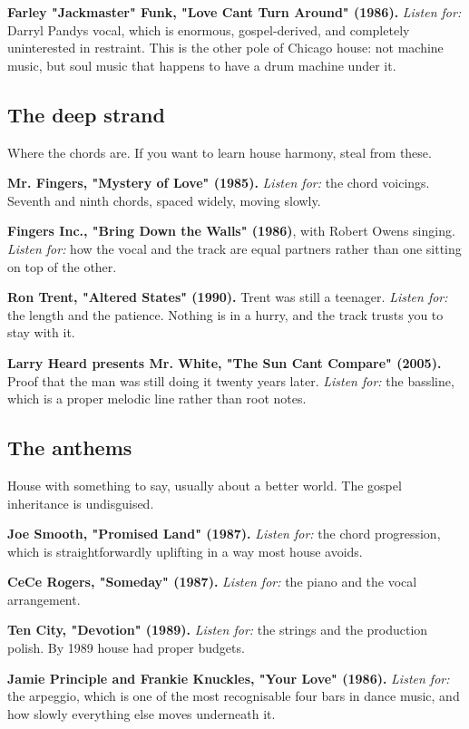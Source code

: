 \textbf{Farley "Jackmaster" Funk, "Love Can\textquotesingle t Turn Around" (1986).} \emph{Listen for:} Darryl Pandy\textquotesingle s
vocal, which is enormous, gospel-derived, and completely uninterested in restraint. This is
the other pole of Chicago house: not machine music, but soul music that happens to have a
drum machine under it.

\subsection{The deep strand}\label{li01_canon-the-deep-strand}

Where the chords are. If you want to learn house harmony, steal from these.

\textbf{Mr. Fingers, "Mystery of Love" (1985).} \emph{Listen for:} the chord voicings. Seventh and
ninth chords, spaced widely, moving slowly.

\textbf{Fingers Inc., "Bring Down the Walls" (1986)}, with Robert Owens singing. \emph{Listen for:} how
the vocal and the track are equal partners rather than one sitting on top of the other.

\textbf{Ron Trent, "Altered States" (1990).} Trent was still a teenager. \emph{Listen for:} the length
and the patience. Nothing is in a hurry, and the track trusts you to stay with it.

\textbf{Larry Heard presents Mr. White, "The Sun Can\textquotesingle t Compare" (2005).} Proof that the man was
still doing it twenty years later. \emph{Listen for:} the bassline, which is a proper melodic
line rather than root notes.

\subsection{The anthems}\label{li01_canon-the-anthems}

House with something to say, usually about a better world. The gospel inheritance is
undisguised.

\textbf{Joe Smooth, "Promised Land" (1987).} \emph{Listen for:} the chord progression, which is
straightforwardly uplifting in a way most house avoids.

\textbf{CeCe Rogers, "Someday" (1987).} \emph{Listen for:} the piano and the vocal arrangement.

\textbf{Ten City, "Devotion" (1989).} \emph{Listen for:} the strings and the production polish. By
1989 house had proper budgets.

\textbf{Jamie Principle and Frankie Knuckles, "Your Love" (1986).} \emph{Listen for:} the arpeggio,
which is one of the most recognisable four bars in dance music, and how slowly everything
else moves underneath it.

